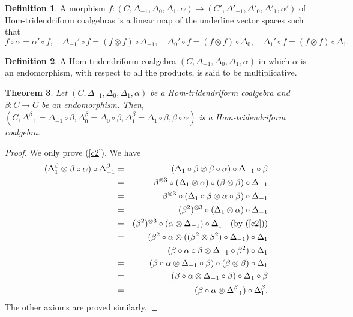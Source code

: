 \documentclass{article}
\newtheorem{thm}{Theorem}[section]
\theoremstyle{definition}
\newtheorem{defn}[thm]{Definition}
\theoremstyle{remark}
\numberwithin{equation}{section}
\begin{document}
\begin{defn}
 A morphism $f : (C, \Delta_{-1}, \Delta_0, \Delta_1, \alpha)\rightarrow (C', \Delta'_{-1}, \Delta'_0, \Delta'_1, \alpha')$
 of Hom-tridendriform coalgebras is a linear map of the underline vector spaces such that
 $$f\circ\alpha=\alpha'\circ f,\quad\Delta_{-1}'\circ f=(f\otimes f)\circ\Delta_{-1},
 \quad\Delta_{0}'\circ f=(f\otimes f)\circ\Delta_0,\quad\Delta_1'\circ f=(f\otimes f)\circ\Delta_1.$$
\end{defn}
 \begin{defn}
 A Hom-tridendriform coalgebra $(C, \Delta_{-1}, \Delta_0, \Delta_1, \alpha)$ in which $\alpha$ is an endomorphism, with respect to
 all the products, is said to be multiplicative. 
 \end{defn}

\begin{thm}
  Let $(C, \Delta_{-1}, \Delta_0, \Delta_1, \alpha)$  be a Hom-tridendriform coalgebra and $\beta : C\rightarrow C$ be an  endomorphism.
 Then,
$(C, \Delta^\beta_{-1}=\Delta_{-1}\circ\beta, \Delta^\beta_0=\Delta_0\circ\beta, \Delta^\beta_1=\Delta_1\circ\beta, \beta\circ\alpha)$ 
  is a Hom-tridendriform coalgebra.
 \end{thm}
 \begin{proof}
 We only prove (\ref{c2}). We have 
 \begin{eqnarray}
 (\Delta^\beta_{1}\otimes\beta\circ\alpha)\circ\Delta^\beta_{-1}
 &=&(\Delta_{1}\circ\beta\otimes\beta\circ\alpha)\circ\Delta_{-1}\circ\beta\nonumber\\
&=&\beta^{\otimes3}\circ(\Delta_{1}\otimes\alpha)\circ(\beta\otimes\beta)\circ\Delta_{-1}\nonumber\\
&=&\beta^{\otimes3}\circ(\Delta_{1}\circ\beta\otimes\alpha\circ\beta)\circ\Delta_{-1}\nonumber\\
 &=&(\beta^2)^{\otimes3}\circ(\Delta_{1}\otimes\alpha)\circ\Delta_{-1}\nonumber\\
 &=&(\beta^2)^{\otimes3}\circ(\alpha\otimes\Delta_{-1})\circ\Delta_1\quad\mbox{(by (\ref{c2})})\nonumber\\
 &=&(\beta^2\circ\alpha\otimes((\beta^2\otimes\beta^2)\circ\Delta_{-1})\circ\Delta_1\nonumber\\
 &=&(\beta\circ\alpha\circ\beta\otimes\Delta_{-1}\circ\beta^2)\circ\Delta_1\nonumber\\
 &=&(\beta\circ\alpha\otimes\Delta_{-1}\circ\beta)\circ(\beta\otimes\beta)\circ\Delta_1\nonumber\\
 &=&(\beta\circ\alpha\otimes\Delta_{-1}\circ\beta)\circ\Delta_1\circ\beta\nonumber\\
 &=&(\beta\circ\alpha\otimes\Delta^\beta_{-1})\circ\Delta^\beta_1\nonumber.
 \end{eqnarray}
 The other axioms are proved similarly.
 \end{proof}
\end{document}
